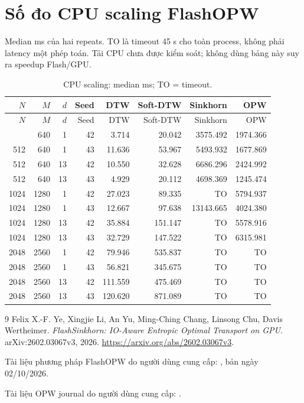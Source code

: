 \documentclass[11pt,a4paper]{article}
\newcommand{\code}[1]{\texttt{\detokenize{#1}}}
\begin{document}
\section{Số đo CPU scaling FlashOPW}
\label{app:cpu-scaling}
Median ms của hai repeats. TO là timeout 45 s cho toàn process,
không phải latency một phép toán. Tải CPU chưa được kiểm soát;
không dùng bảng này suy ra speedup Flash/GPU.
\begingroup\small
\begin{longtable}{@{}rrrrrrrr@{}}
\caption{CPU scaling: median ms; TO = timeout.}\label{tab:cpu-scaling}\\
\toprule
$N$ & $M$ & $d$ & Seed & DTW & Soft-DTW & Sinkhorn & OPW \\
\midrule\endfirsthead
\toprule
$N$ & $M$ & $d$ & Seed & DTW & Soft-DTW & Sinkhorn & OPW \\
\midrule\endhead
\bottomrule\endfoot
512 & 640 & 1 & 42 & 3.714 & 20.042 & 3575.492 & 1974.366 \\
512 & 640 & 1 & 43 & 11.636 & 53.967 & 5493.932 & 1677.869 \\
512 & 640 & 13 & 42 & 10.550 & 32.628 & 6686.296 & 2424.992 \\
512 & 640 & 13 & 43 & 4.929 & 20.112 & 4698.369 & 1245.474 \\
1024 & 1280 & 1 & 42 & 27.023 & 89.335 & TO & 5794.937 \\
1024 & 1280 & 1 & 43 & 12.667 & 97.638 & 13143.665 & 4024.380 \\
1024 & 1280 & 13 & 42 & 35.884 & 151.147 & TO & 5578.916 \\
1024 & 1280 & 13 & 43 & 32.729 & 147.522 & TO & 6315.981 \\
2048 & 2560 & 1 & 42 & 79.946 & 535.837 & TO & TO \\
2048 & 2560 & 1 & 43 & 56.821 & 345.675 & TO & TO \\
2048 & 2560 & 13 & 42 & 111.559 & 475.469 & TO & TO \\
2048 & 2560 & 13 & 43 & 120.620 & 871.089 & TO & TO \\
\end{longtable}
\endgroup

\begin{thebibliography}{9}
Felix X.-F. Ye, Xingjie Li, An Yu, Ming-Ching Chang, Linsong Chu,
Davis Wertheimer.
\emph{FlashSinkhorn: IO-Aware Entropic Optimal Transport on GPU}.
arXiv:2602.03067v3, 2026.
\url{https://arxiv.org/abs/2602.03067v3}.

Tài liệu phương pháp FlashOPW do người dùng cung cấp:
\code{main (2).pdf}, bản ngày 02/10/2026.

Tài liệu OPW journal do người dùng cung cấp: \code{OWD_journal.pdf}.
\end{thebibliography}
\end{document}
